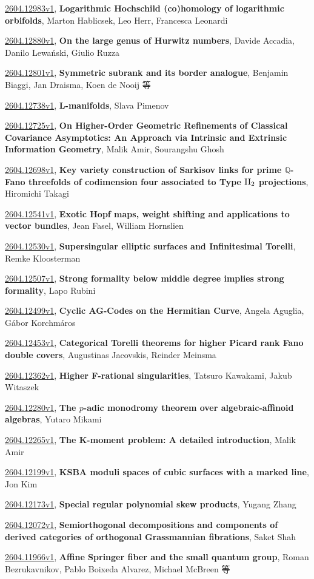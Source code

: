 \documentclass[9pt, a4paper]{article}
\theoremstyle{plain}
\theoremstyle{definition}
\theoremstyle{remark}
\newcommand{\arxiv}[3]{\href{https://arxiv.org/abs/#1}{#1}, \textbf{\textcolor{arxivblue}{#2}}, #3}
\begin{document}
\arxiv{2604.12983v1}{Logarithmic Hochschild (co)homology of logarithmic orbifolds}{Marton Hablicsek, Leo Herr, Francesca Leonardi}

\arxiv{2604.12880v1}{On the large genus of Hurwitz numbers}{Davide Accadia, Danilo Lewański, Giulio Ruzza}

\arxiv{2604.12801v1}{Symmetric subrank and its border analogue}{Benjamin Biaggi, Jan Draisma, Koen de Nooij 等}

\arxiv{2604.12738v1}{L-manifolds}{Slava Pimenov}

\arxiv{2604.12725v1}{On Higher-Order Geometric Refinements of Classical Covariance Asymptotics: An Approach via Intrinsic and Extrinsic Information Geometry}{Malik Amir, Sourangshu Ghosh}

\arxiv{2604.12698v1}{Key variety construction of Sarkisov links for prime $\mathbb{Q}$-Fano threefolds of codimension four associated to Type ${\rm II}_{2}$ projections}{Hiromichi Takagi}

\arxiv{2604.12541v1}{Exotic Hopf maps, weight shifting and applications to vector bundles}{Jean Fasel, William Hornslien}

\arxiv{2604.12530v1}{Supersingular elliptic surfaces and Infinitesimal Torelli}{Remke Kloosterman}

\arxiv{2604.12507v1}{Strong formality below middle degree implies strong formality}{Lapo Rubini}

\arxiv{2604.12499v1}{Cyclic AG-Codes on the Hermitian Curve}{Angela Aguglia, Gábor Korchmáros}

\arxiv{2604.12453v1}{Categorical Torelli theorems for higher Picard rank Fano double covers}{Augustinas Jacovskis, Reinder Meinsma}

\arxiv{2604.12362v1}{Higher F-rational singularities}{Tatsuro Kawakami, Jakub Witaszek}

\arxiv{2604.12280v1}{The $p$-adic monodromy theorem over algebraic-affinoid algebras}{Yutaro Mikami}

\arxiv{2604.12265v1}{The K-moment problem: A detailed introduction}{Malik Amir}

\arxiv{2604.12199v1}{KSBA moduli spaces of cubic surfaces with a marked line}{Jon Kim}

\arxiv{2604.12173v1}{Special regular polynomial skew products}{Yugang Zhang}

\arxiv{2604.12072v1}{Semiorthogonal decompositions and components of derived categories of orthogonal Grassmannian fibrations}{Saket Shah}

\arxiv{2604.11966v1}{Affine Springer fiber and the small quantum group}{Roman Bezrukavnikov, Pablo Boixeda Alvarez, Michael McBreen 等}
\end{document}
